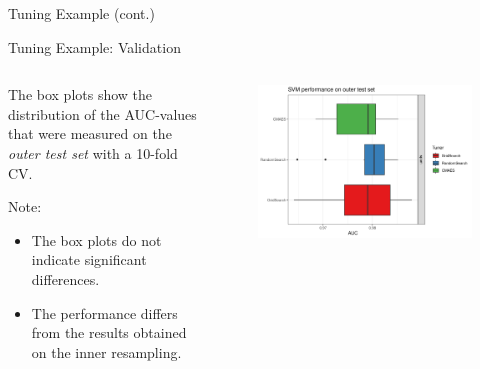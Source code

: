 \begin{frame}{Tuning Example (cont.)}
\end{frame}

\begin{frame}{Tuning Example: Validation}

\begin{columns}
\begin{column}{0.4\textwidth}
  \footnotesize

  The box plots show the distribution of the AUC-values that were measured on the \emph{outer test set} with a 10-fold CV.

  Note:

  \begin{itemize}
    \item The box plots do not indicate significant differences.
    \item The performance differs from the results obtained on the inner resampling.
  \end{itemize}

\end{column}
\begin{column}{0.6\textwidth}
  \vspace{-1em}
  \begin{figure}
  \includegraphics[width=\textwidth]{images/benchmark_boxplot_tuners.png}
  \end{figure}
\end{column}
\end{columns}
\end{frame}

